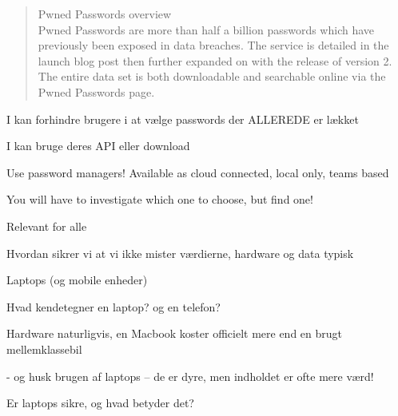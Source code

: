 \documentclass[Screen16to9,17pt]{foils}
\begin{document}

\begin{quote}
Pwned Passwords overview\\
Pwned Passwords are more than half a billion passwords which have previously been exposed in data breaches. The service is detailed in the launch blog post then further expanded on with the release of version 2. The entire data set is both downloadable and searchable online via the Pwned Passwords page.
\end{quote}

\begin{list1}
\item I kan forhindre brugere i at vælge passwords der ALLEREDE er lækket
\item I kan bruge deres API eller download\\
{\footnotesize{}}
\end{list1}




\begin{list2}
\item Use password managers! Available as cloud connected, local only, teams based
\item You will have to investigate which one to choose, but find one!
\end{list2}




\begin{list2}
\item Relevant for alle
\item Hvordan sikrer vi at vi ikke mister værdierne, hardware og data typisk
\end{list2}




\begin{list2}
\item Laptops (og mobile enheder)
\item Hvad kendetegner en laptop? og en telefon?
\item Hardware naturligvis, en Macbook koster officielt mere end en brugt mellemklassebil
\item - og husk brugen af laptops -- de er dyre, men indholdet er ofte mere værd!
\item Er laptops sikre, og hvad betyder det?
\end{list2}
\end{document}
